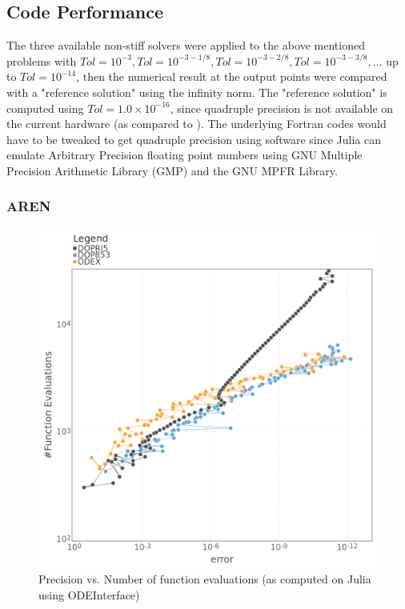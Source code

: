 \documentclass[notitlepage,12pt]{article}
\begin{document}
\subsection{Code Performance}
\label{sec:codePerfNonStiff}
The three available non-stiff solvers were applied to the above mentioned problems with $Tol = 10^{-3} , Tol =
10^{-3-1/8} , Tol = 10^{-3-2/8}, Tol = 10^{-3-3/8},\ldots$ up to $Tol = 10^{-14}$, then the numerical result at the output points were compared with a "reference solution" using the infinity norm. The "reference solution" is computed using $Tol=1.0\times 10^{-16}$, since quadruple precision is not available on the current hardware (as compared to \cite{nonStiff}). The underlying Fortran codes would have to be tweaked to get quadruple precision using software since Julia can emulate Arbitrary Precision floating point numbers using GNU Multiple Precision Arithmetic Library (GMP) and the GNU MPFR Library.

\subsubsection{AREN}
\label{sub:aren}

\begin{figure}[H]
\centering
\includegraphics[scale=0.4]{../ImagesAndPDFs/Plots/ArenstorfPrecisionTest.png}
\caption{Precision vs. Number of function evaluations (as computed on Julia using ODEInterface)}
\label{fig:arenJulia}
\end{figure}
\end{document}
